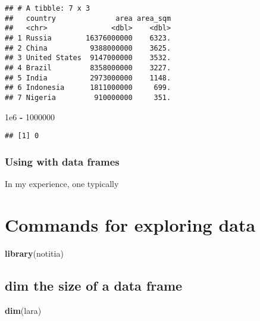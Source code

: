 \documentclass[]{book}
\newenvironment{Shaded}{\begin{snugshade}}{\end{snugshade}}
\newcommand{\DecValTok}[1]{\textcolor[rgb]{0.00,0.00,0.81}{#1}}
\newcommand{\FloatTok}[1]{\textcolor[rgb]{0.00,0.00,0.81}{#1}}
\newcommand{\KeywordTok}[1]{\textcolor[rgb]{0.13,0.29,0.53}{\textbf{#1}}}
\newcommand{\NormalTok}[1]{#1}
\newcommand{\OperatorTok}[1]{\textcolor[rgb]{0.81,0.36,0.00}{\textbf{#1}}}
\newcommand{\StringTok}[1]{\textcolor[rgb]{0.31,0.60,0.02}{#1}}
\begin{document}
\begin{verbatim}
## # A tibble: 7 x 3
##   country              area area_sqm
##   <chr>               <dbl>    <dbl>
## 1 Russia        16376000000    6323.
## 2 China          9388000000    3625.
## 3 United States  9147000000    3532.
## 4 Brazil         8358000000    3227.
## 5 India          2973000000    1148.
## 6 Indonesia      1811000000     699.
## 7 Nigeria         910000000     351.
\end{verbatim}

\begin{Shaded}
\begin{Highlighting}[]
\FloatTok{1e6} \OperatorTok{-}\StringTok{ }\DecValTok{1000000}
\end{Highlighting}
\end{Shaded}

\begin{verbatim}
## [1] 0
\end{verbatim}

\hypertarget{sqbracketsdf}{%
\subsection*{\texorpdfstring{Using \protect\hyperlink{dollarsignnew}{} with data frames}{Using  with data frames}}\label{sqbracketsdf}}

In my experience, one typically

\hypertarget{commands-for-exploring-data}{%
\chapter{Commands for exploring data}\label{commands-for-exploring-data}}

\begin{Shaded}
\begin{Highlighting}[]
\KeywordTok{library}\NormalTok{(notitia)}
\end{Highlighting}
\end{Shaded}

\hypertarget{dim}{%
\section*{\texorpdfstring{\textbf{dim} the size of a data frame}{dim the size of a data frame}}\label{dim}}

\begin{Shaded}
\begin{Highlighting}[]
\KeywordTok{dim}\NormalTok{(lara)}
\end{Highlighting}
\end{Shaded}
\end{document}

